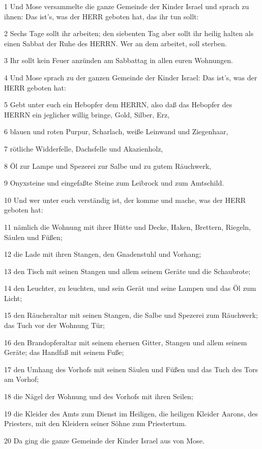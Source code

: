 \par 1 Und Mose versammelte die ganze Gemeinde der Kinder Israel und sprach zu ihnen: Das ist's, was der HERR geboten hat, das ihr tun sollt:
\par 2 Sechs Tage sollt ihr arbeiten; den siebenten Tag aber sollt ihr heilig halten als einen Sabbat der Ruhe des HERRN. Wer an dem arbeitet, soll sterben.
\par 3 Ihr sollt kein Feuer anzünden am Sabbattag in allen euren Wohnungen.
\par 4 Und Mose sprach zu der ganzen Gemeinde der Kinder Israel: Das ist's, was der HERR geboten hat:
\par 5 Gebt unter euch ein Hebopfer dem HERRN, also daß das Hebopfer des HERRN ein jeglicher willig bringe, Gold, Silber, Erz,
\par 6 blauen und roten Purpur, Scharlach, weiße Leinwand und Ziegenhaar,
\par 7 rötliche Widderfelle, Dachsfelle und Akazienholz,
\par 8 Öl zur Lampe und Spezerei zur Salbe und zu gutem Räuchwerk,
\par 9 Onyxsteine und eingefaßte Steine zum Leibrock und zum Amtschild.
\par 10 Und wer unter euch verständig ist, der komme und mache, was der HERR geboten hat:
\par 11 nämlich die Wohnung mit ihrer Hütte und Decke, Haken, Brettern, Riegeln, Säulen und Füßen;
\par 12 die Lade mit ihren Stangen, den Gnadenstuhl und Vorhang;
\par 13 den Tisch mit seinen Stangen und allem seinem Geräte und die Schaubrote;
\par 14 den Leuchter, zu leuchten, und sein Gerät und seine Lampen und das Öl zum Licht;
\par 15 den Räucheraltar mit seinen Stangen, die Salbe und Spezerei zum Räuchwerk; das Tuch vor der Wohnung Tür;
\par 16 den Brandopferaltar mit seinem ehernen Gitter, Stangen und allem seinem Geräte; das Handfaß mit seinem Fuße;
\par 17 den Umhang des Vorhofs mit seinen Säulen und Füßen und das Tuch des Tors am Vorhof;
\par 18 die Nägel der Wohnung und des Vorhofs mit ihren Seilen;
\par 19 die Kleider des Amts zum Dienst im Heiligen, die heiligen Kleider Aarons, des Priesters, mit den Kleidern seiner Söhne zum Priestertum.
\par 20 Da ging die ganze Gemeinde der Kinder Israel aus von Mose.

